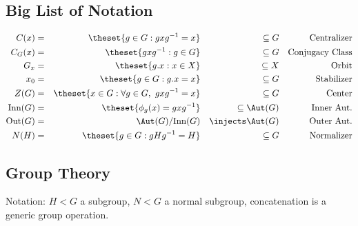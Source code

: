 \hypertarget{big-list-of-notation}{%
\subsection{Big List of Notation}\label{big-list-of-notation}}

\begin{align*}
C(x)            = && \theset{g\in G : gxg^{-1} = x}                 && \subseteq G          && \text{Centralizer} \\
C_G(x)          = && \theset{gxg^{-1} : g\in G}                     && \subseteq G          && \text{Conjugacy Class} \\
G_x             = && \theset{g.x : x\in X}                          && \subseteq X          && \text{Orbit} \\
x_0             = && \theset{g\in G : g.x = x}                      && \subseteq G          && \text{Stabilizer} \\
Z(G)            = && \theset{x\in G: \forall g\in G,~ gxg^{-1} = x} && \subseteq G          && \text{Center} \\
\mathrm{Inn}(G) = && \theset{\phi_g(x) = gxg^{-1} }                 && \subseteq \Aut(G)    && \text{Inner Aut.} \\
\mathrm{Out}(G) = && \Aut(G) / \mathrm{Inn}(G)                      && \injects \Aut(G)     && \text{Outer Aut.} \\
N(H)            = && \theset{g\in G: gHg^{-1} = H}                  && \subseteq G          && \text{Normalizer}
\end{align*}

\hypertarget{group-theory}{%
\subsection{Group Theory}\label{group-theory}}

Notation: \(H < G\) a subgroup, \(N < G\) a normal subgroup,
concatenation is a generic group operation.

